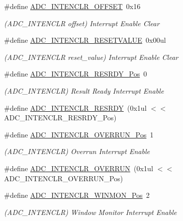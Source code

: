 \begin{DoxyCompactItemize}
\#define \mbox{\hyperlink{group___s_a_m_d21___a_d_c_ga2ee30f1da1a9071d819e8ec44e4c33e3}{A\+D\+C\+\_\+\+I\+N\+T\+E\+N\+C\+L\+R\+\_\+\+O\+F\+F\+S\+ET}}~0x16
\begin{DoxyCompactList}\small\item\em (A\+D\+C\+\_\+\+I\+N\+T\+E\+N\+C\+LR offset) Interrupt Enable Clear \end{DoxyCompactList}\item 
\#define \mbox{\hyperlink{group___s_a_m_d21___a_d_c_gab16539d50c97ef7fd06085b36ef7c588}{A\+D\+C\+\_\+\+I\+N\+T\+E\+N\+C\+L\+R\+\_\+\+R\+E\+S\+E\+T\+V\+A\+L\+UE}}~0x00ul
\begin{DoxyCompactList}\small\item\em (A\+D\+C\+\_\+\+I\+N\+T\+E\+N\+C\+LR reset\+\_\+value) Interrupt Enable Clear \end{DoxyCompactList}\item 
\#define \mbox{\hyperlink{group___s_a_m_d21___a_d_c_gab124f90030235c342336b98942b4765c}{A\+D\+C\+\_\+\+I\+N\+T\+E\+N\+C\+L\+R\+\_\+\+R\+E\+S\+R\+D\+Y\+\_\+\+Pos}}~0
\begin{DoxyCompactList}\small\item\em (A\+D\+C\+\_\+\+I\+N\+T\+E\+N\+C\+LR) Result Ready Interrupt Enable \end{DoxyCompactList}\item 
\#define \mbox{\hyperlink{group___s_a_m_d21___a_d_c_ga5387dd779ac5635023a51bbc4cb6ca3c}{A\+D\+C\+\_\+\+I\+N\+T\+E\+N\+C\+L\+R\+\_\+\+R\+E\+S\+R\+DY}}~(0x1ul $<$$<$ A\+D\+C\+\_\+\+I\+N\+T\+E\+N\+C\+L\+R\+\_\+\+R\+E\+S\+R\+D\+Y\+\_\+\+Pos)
\item 
\#define \mbox{\hyperlink{group___s_a_m_d21___a_d_c_ga6fcd472698b48b4db47c658690780641}{A\+D\+C\+\_\+\+I\+N\+T\+E\+N\+C\+L\+R\+\_\+\+O\+V\+E\+R\+R\+U\+N\+\_\+\+Pos}}~1
\begin{DoxyCompactList}\small\item\em (A\+D\+C\+\_\+\+I\+N\+T\+E\+N\+C\+LR) Overrun Interrupt Enable \end{DoxyCompactList}\item 
\#define \mbox{\hyperlink{group___s_a_m_d21___a_d_c_gab3033acdbda3633f79d05511f31650e8}{A\+D\+C\+\_\+\+I\+N\+T\+E\+N\+C\+L\+R\+\_\+\+O\+V\+E\+R\+R\+UN}}~(0x1ul $<$$<$ A\+D\+C\+\_\+\+I\+N\+T\+E\+N\+C\+L\+R\+\_\+\+O\+V\+E\+R\+R\+U\+N\+\_\+\+Pos)
\item 
\#define \mbox{\hyperlink{group___s_a_m_d21___a_d_c_ga18577e9e20c28d5b25f1674ce80a331f}{A\+D\+C\+\_\+\+I\+N\+T\+E\+N\+C\+L\+R\+\_\+\+W\+I\+N\+M\+O\+N\+\_\+\+Pos}}~2
\begin{DoxyCompactList}\small\item\em (A\+D\+C\+\_\+\+I\+N\+T\+E\+N\+C\+LR) Window Monitor Interrupt Enable \end{DoxyCompactList}\item 

\end{DoxyCompactItemize}
